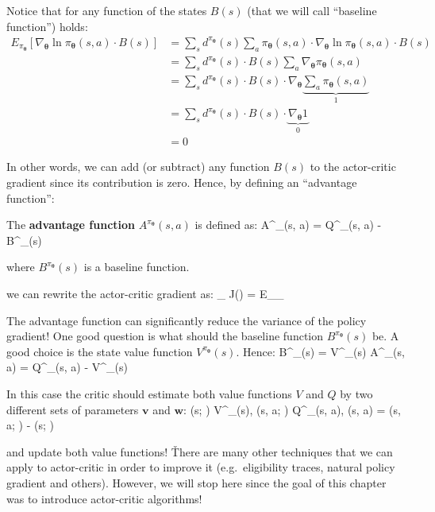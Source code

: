 Notice that for any function of the states $B(s)$ (that we will call ``baseline function'') holds:
{\setlength{\jot}{10pt}
\begin{align*}
E_{\pi_{\boldsymbol{\theta}}} \left[ \nabla_{\boldsymbol{\theta}} \ln \pi_{\boldsymbol{\theta}}(s, a) \cdot B(s)
\right] &= \sum_{s} d^{\pi_{\boldsymbol{\theta}}}(s) \sum_{a} \pi_{\boldsymbol{\theta}}(s, a) \cdot
\nabla_{\boldsymbol{\theta}} \ln \pi_{\boldsymbol{\theta}}(s, a) \cdot B(s) \\
&= \sum_{s} d^{\pi_{\boldsymbol{\theta}}}(s) \cdot B(s) \sum_{a} \nabla_{\boldsymbol{\theta}}
\pi_{\boldsymbol{\theta}}(s, a) \\
&= \sum_{s} d^{\pi_{\boldsymbol{\theta}}}(s) \cdot B(s) \cdot \nabla_{\boldsymbol{\theta}}
\underbrace{\sum_{a} \pi_{\boldsymbol{\theta}}(s, a)}_{1} \\
&= \sum_{s} d^{\pi_{\boldsymbol{\theta}}}(s) \cdot B(s) \cdot \underbrace{\nabla_{\boldsymbol{\theta}}
1}_{0} \\
&= 0
\end{align*}}

\vspace{-10pt}

In other words, we can add (or subtract) any function $B(s)$ to the actor-critic gradient since its contribution is
zero. Hence, by defining an ``advantage function'':

The \textbf{advantage function} $A^{\pi_{\boldsymbol{\theta}}}(s,a)$ is defined as:
\bse
A^{\pi_{\boldsymbol{\theta}}}(s, a) = Q^{\pi_{\boldsymbol{\theta}}}(s, a) - B^{\pi_{\boldsymbol{\theta}}}(s)
\ese

where $B^{\pi_{\boldsymbol{\theta}}}(s)$ is a baseline function.
\ed

we can rewrite the actor-critic gradient as:
\bse
\nabla_{\boldsymbol{\theta}} J(\boldsymbol{\theta}) = E_{\pi_{\boldsymbol{\theta}}} 
\ese

The advantage function can significantly reduce the variance of the policy gradient! One good question is what
should the baseline function $B^{\pi_{\boldsymbol{\theta}}}(s)$ be. A good choice is the state value function
$V^{\pi_{\boldsymbol{\theta}}}(s)$. Hence:
\bse
B^{\pi_{\boldsymbol{\theta}}}(s) = V^{\pi_{\boldsymbol{\theta}}}(s) \imp
A^{\pi_{\boldsymbol{\theta}}}(s, a) = Q^{\pi_{\boldsymbol{\theta}}}(s, a) - V^{\pi_{\boldsymbol{\theta}}}(s)
\ese

In this case the critic should estimate both value functions $V$ and $Q$ by two different sets of parameters
$\boldsymbol{v}$ and $\boldsymbol{w}$:
\bse
{}(s; ) \approx V^{\pi_{\boldsymbol{\theta}}}(s), \qquad
{}(s, a; ) \approx Q^{\pi_{\boldsymbol{\theta}}}(s, a), \qquad
{}(s, a) = (s, a; ) - (s; )
\ese

and update both value functions! \v

There are many other techniques that we can apply to actor-critic in order to improve it (e.g.\ eligibility traces,
natural policy gradient and others). However, we will stop here since the goal of this chapter was to introduce
actor-critic algorithms!